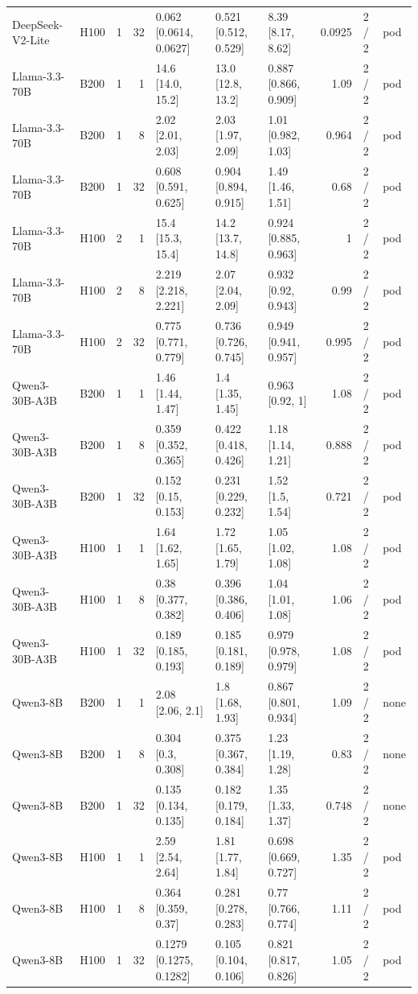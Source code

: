 \begin{landscape}
\begin{longtable}{llrrlllrll}
DeepSeek-V2-Lite & H100 & 1 & 32 & 0.062 {[}0.0614, 0.0627{]} & 0.521 {[}0.512, 0.529{]} & 8.39 {[}8.17, 8.62{]} & 0.0925 & 2 / 2 & pod \\
Llama-3.3-70B & B200 & 1 & 1 & 14.6 {[}14.0, 15.2{]} & 13.0 {[}12.8, 13.2{]} & 0.887 {[}0.866, 0.909{]} & 1.09 & 2 / 2 & pod \\
Llama-3.3-70B & B200 & 1 & 8 & 2.02 {[}2.01, 2.03{]} & 2.03 {[}1.97, 2.09{]} & 1.01 {[}0.982, 1.03{]} & 0.964 & 2 / 2 & pod \\
Llama-3.3-70B & B200 & 1 & 32 & 0.608 {[}0.591, 0.625{]} & 0.904 {[}0.894, 0.915{]} & 1.49 {[}1.46, 1.51{]} & 0.68 & 2 / 2 & pod \\
Llama-3.3-70B & H100 & 2 & 1 & 15.4 {[}15.3, 15.4{]} & 14.2 {[}13.7, 14.8{]} & 0.924 {[}0.885, 0.963{]} & 1 & 2 / 2 & pod \\
Llama-3.3-70B & H100 & 2 & 8 & 2.219 {[}2.218, 2.221{]} & 2.07 {[}2.04, 2.09{]} & 0.932 {[}0.92, 0.943{]} & 0.99 & 2 / 2 & pod \\
Llama-3.3-70B & H100 & 2 & 32 & 0.775 {[}0.771, 0.779{]} & 0.736 {[}0.726, 0.745{]} & 0.949 {[}0.941, 0.957{]} & 0.995 & 2 / 2 & pod \\
Qwen3-30B-A3B & B200 & 1 & 1 & 1.46 {[}1.44, 1.47{]} & 1.4 {[}1.35, 1.45{]} & 0.963 {[}0.92, 1{]} & 1.08 & 2 / 2 & pod \\
Qwen3-30B-A3B & B200 & 1 & 8 & 0.359 {[}0.352, 0.365{]} & 0.422 {[}0.418, 0.426{]} & 1.18 {[}1.14, 1.21{]} & 0.888 & 2 / 2 & pod \\
Qwen3-30B-A3B & B200 & 1 & 32 & 0.152 {[}0.15, 0.153{]} & 0.231 {[}0.229, 0.232{]} & 1.52 {[}1.5, 1.54{]} & 0.721 & 2 / 2 & pod \\
Qwen3-30B-A3B & H100 & 1 & 1 & 1.64 {[}1.62, 1.65{]} & 1.72 {[}1.65, 1.79{]} & 1.05 {[}1.02, 1.08{]} & 1.08 & 2 / 2 & pod \\
Qwen3-30B-A3B & H100 & 1 & 8 & 0.38 {[}0.377, 0.382{]} & 0.396 {[}0.386, 0.406{]} & 1.04 {[}1.01, 1.08{]} & 1.06 & 2 / 2 & pod \\
Qwen3-30B-A3B & H100 & 1 & 32 & 0.189 {[}0.185, 0.193{]} & 0.185 {[}0.181, 0.189{]} & 0.979 {[}0.978, 0.979{]} & 1.08 & 2 / 2 & pod \\
Qwen3-8B & B200 & 1 & 1 & 2.08 {[}2.06, 2.1{]} & 1.8 {[}1.68, 1.93{]} & 0.867 {[}0.801, 0.934{]} & 1.09 & 2 / 2 & none \\
Qwen3-8B & B200 & 1 & 8 & 0.304 {[}0.3, 0.308{]} & 0.375 {[}0.367, 0.384{]} & 1.23 {[}1.19, 1.28{]} & 0.83 & 2 / 2 & none \\
Qwen3-8B & B200 & 1 & 32 & 0.135 {[}0.134, 0.135{]} & 0.182 {[}0.179, 0.184{]} & 1.35 {[}1.33, 1.37{]} & 0.748 & 2 / 2 & none \\
Qwen3-8B & H100 & 1 & 1 & 2.59 {[}2.54, 2.64{]} & 1.81 {[}1.77, 1.84{]} & 0.698 {[}0.669, 0.727{]} & 1.35 & 2 / 2 & pod \\
Qwen3-8B & H100 & 1 & 8 & 0.364 {[}0.359, 0.37{]} & 0.281 {[}0.278, 0.283{]} & 0.77 {[}0.766, 0.774{]} & 1.11 & 2 / 2 & pod \\
Qwen3-8B & H100 & 1 & 32 & 0.1279 {[}0.1275, 0.1282{]} & 0.105 {[}0.104, 0.106{]} & 0.821 {[}0.817, 0.826{]} & 1.05 & 2 / 2 & pod \\
\end{longtable}
\endgroup
\end{landscape}
\restoregeometry
